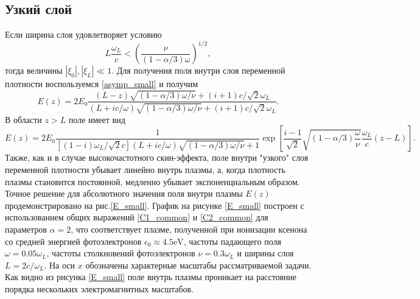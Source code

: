 \documentclass[12pt,a4paper]{article}
\numberwithin{equation}{section}
\begin{document}
{\subsection{Узкий слой}
Если ширина слоя удовлетворяет условию
\begin{equation}
    \label{thin_ns}
    L\frac{\omega_L}{c}< \left(\frac{\nu}{\left(1-\alpha/3\right)\omega}\right)^{1/2},
\end{equation}
тогда величины $|\xi_0|, |\xi_L| \ll 1$. Для получения поля внутри слоя переменной плотности воспользуемся \eqref{asymp_small} и получим
\begin{equation}
    \label{E1_ns_small}
    E\left(z\right)= 2E_0\frac{\left(L-z\right)\sqrt{\left(1-\alpha/3\right)\omega/\nu}+\left(i+1\right)c/\sqrt{2}\omega_L}{\left(L+ic/\omega\right)\sqrt{\left(1-\alpha/3\right)\omega/\nu}+\left(i+1\right)c/\sqrt{2}\omega_L}.
\end{equation}
В области $z>L$ поле имеет вид
\begin{equation}
    \label{E2_ns_small}
     E\left(z\right) = 2E_0   \frac{1}{\left[\left(1-i\right)\omega_L/\sqrt{2}c\right]\left(L+ic/\omega\right)\sqrt{\left(1-\alpha/3\right)\omega/\nu}+1}\exp\left[\frac{i-1}{\sqrt{2}}\sqrt{\left(1-\alpha/3\right)\frac{\omega}{\nu}}\frac{\omega_L}{c}\left(z-L\right)\right].
\end{equation}
Также, как и в случае высокочастотного скин-эффекта, поле внутри "узкого" слоя переменной плотности убывает линейно внутрь плазмы, а, когда плотность плазмы становится постоянной, медленно убывает экспоненциальным образом. Точное решение для абсолютного значения поля внутри плазмы $E\left(z\right)$ продемонстрировано на рис.\ref{E_small}. График на рисунке \ref{E_small} построен с использованием общих выражений \eqref{C1_common} и \eqref{C2_common} для параметров $\alpha = 2$, что соответствует плазме, полученной при ионизации ксенона со средней энергией фотоэлектронов $\epsilon_0\approx4.5\text{eV}$, частоты падающего поля $\omega = 0.05\omega_L$, частоты столкновений фотоэлектронов $\nu = 0.3 \omega_L$ и ширины слоя $L =2 c/\omega_L$. На оси $x$ обозначены характерные масштабы рассматриваемой задачи. Как видно из рисунка \eqref{E_small} поле внутрь плазмы проникает на расстояние порядка нескольких электромагнитных масштабов.
\begin{figure}[!ht]	

\end{figure}}
\end{document}
